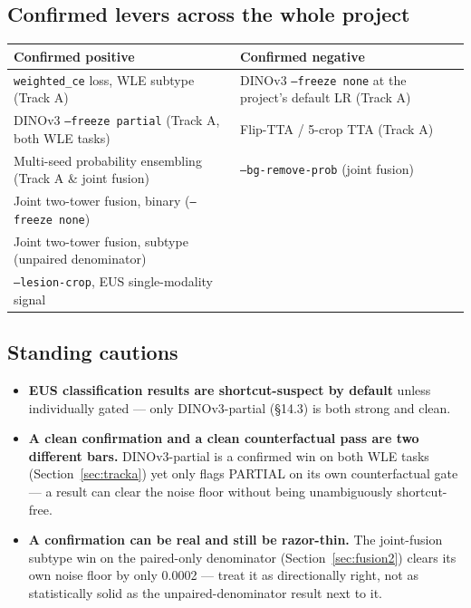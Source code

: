 \documentclass[10pt]{article}
\begin{document}
\subsection{Confirmed levers across the whole project}

\begin{center}
\begin{tabular}{L{6.8cm}L{6.2cm}}
\toprule
\textbf{Confirmed positive} & \textbf{Confirmed negative} \\
\midrule
\texttt{weighted\_ce} loss, WLE subtype (Track A) & DINOv3 \texttt{--freeze none} at the project's default LR (Track A) \\
DINOv3 \texttt{--freeze partial} (Track A, both WLE tasks) & Flip-TTA / 5-crop TTA (Track A) \\
Multi-seed probability ensembling (Track A \& joint fusion) & \texttt{--bg-remove-prob} (joint fusion) \\
Joint two-tower fusion, binary (\texttt{--freeze none}) & \\
Joint two-tower fusion, subtype (unpaired denominator) & \\
\texttt{--lesion-crop}, EUS single-modality signal & \\
\bottomrule
\end{tabular}
\end{center}

\subsection{Standing cautions}

\begin{itemize}[nosep]
  \item \textbf{EUS classification results are shortcut-suspect by default} unless individually gated ---
    only DINOv3-partial (\S14.3) is both strong and clean.
  \item \textbf{A clean confirmation and a clean counterfactual pass are two different bars.} DINOv3-partial
    is a confirmed win on both WLE tasks (Section~\ref{sec:tracka}) yet only flags PARTIAL on its own
    counterfactual gate --- a result can clear the noise floor without being unambiguously shortcut-free.
  \item \textbf{A confirmation can be real and still be razor-thin.} The joint-fusion subtype win on the
    paired-only denominator (Section~\ref{sec:fusion2}) clears its own noise floor by only 0.0002 --- treat
    it as directionally right, not as statistically solid as the unpaired-denominator result next to it.
\end{itemize}
\end{document}
